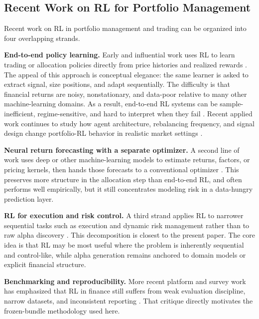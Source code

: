 \documentclass[10pt,twocolumn]{article}
\begin{document}
\subsection{Recent Work on RL for Portfolio Management}

Recent work on RL in portfolio management and trading can be organized into four
overlapping strands.

\textbf{End-to-end policy learning.} Early and influential work uses RL to learn
trading or allocation policies directly from price histories and realized
rewards \cite{moody2001,deng2017,jiang2017,zhang2020,cong2021,pacheco2023}. The appeal of
this approach is conceptual elegance: the same learner is asked to extract
signal, size positions, and adapt sequentially. The difficulty is that
financial returns are noisy, nonstationary, and data-poor relative to many
other machine-learning domains. As a result, end-to-end RL systems can be
sample-inefficient, regime-sensitive, and hard to interpret when they fail
\cite{gu2020,kolm2019,jander2025}. Recent applied work continues to study how
agent architecture, rebalancing frequency, and signal design change
portfolio-RL behavior in realistic market settings \cite{ayari2025}.

\textbf{Neural return forecasting with a separate optimizer.} A second line of
work uses deep or other machine-learning models to estimate returns, factors, or
pricing kernels, then hands those forecasts to a conventional optimizer
\cite{gu2020,chen2021,giglio2022}. This preserves more structure in the
allocation step than end-to-end RL, and often performs well empirically, but it
still concentrates modeling risk in a data-hungry prediction layer.

\textbf{RL for execution and risk control.} A third strand applies RL to
narrower sequential tasks such as execution and dynamic risk management rather
than to raw alpha discovery \cite{nevmyvaka2006,kolm2019hedge,buehler2019,du2020}.
This decomposition is closest to the present paper. The core idea is that RL
may be most useful where the problem is inherently sequential and control-like,
while alpha generation remains anchored to domain models or explicit financial
structure.

\textbf{Benchmarking and reproducibility.} More recent platform and survey work
has emphasized that RL in finance still suffers from weak evaluation discipline,
narrow datasets, and inconsistent reporting \cite{sun2023,jander2025}. That
critique directly motivates the frozen-bundle methodology used here.
\end{document}
